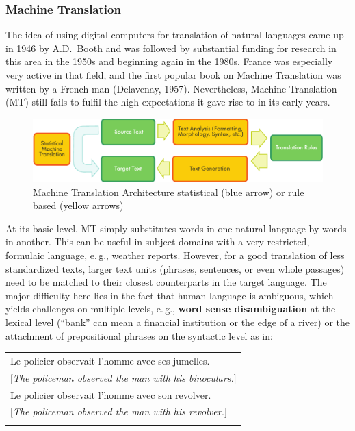 \begin{multicols}{2}
\subsubsection{Machine Translation}
The idea of using digital computers for translation of natural
languages came up in 1946 by A.D.~Booth and was followed by
substantial funding for research in this area in the 1950s and
beginning again in the 1980s. France was especially very active in
that field, and the first popular book on Machine Translation was
written by a French man (Delavenay, 1957). Nevertheless, Machine
Translation (MT) still fails to fulfil the high expectations it gave
rise to in its early years.

\begin{figure}
\begin{center}
 \includegraphics[width=\textwidth]{../_media/english/machine_translation}
\caption{Machine Translation Architecture statistical (blue arrow) or rule based (yellow arrows)}
\label{fig:mtarchiEng}
\end{center}
\end{figure}

At its basic level, MT simply substitutes words in one natural
language by words in another. This can be useful in subject domains
with a very restricted, formulaic language, e.\,g., weather
reports. However, for a good translation of less standardized texts,
larger text units (phrases, sentences, or even whole passages) need to
be matched to their closest counterparts in the target language. The
major difficulty here lies in the fact that human language is
ambiguous, which yields challenges on multiple levels, e.\,g., {\bf word
sense disambiguation} at the lexical level (``bank'' can mean a financial institution or the edge of a river) or the attachment of prepositional phrases on the syntactic
level as in:
\begin{tabular}{l}
\\
Le policier observait l'homme avec ses jumelles.\\
$[${\em The policeman observed the man with his binoculars.}$]$\\
Le policier observait l'homme avec son revolver.\\
$[${\em The policeman observed the man with his revolver.}$]$\\
\\
\end{tabular}


\end{multicols}

